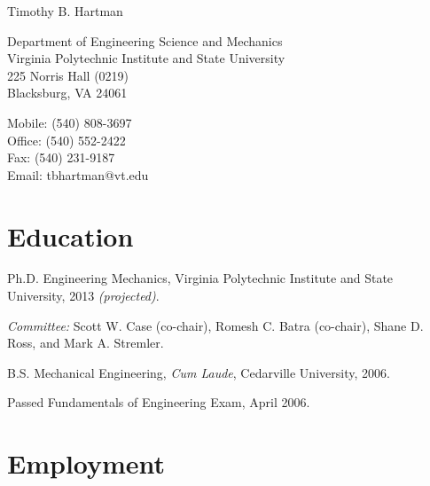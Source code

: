 \documentclass[10pt,letterpaper]{article}
\def\name{Timothy B. Hartman}
\renewenvironment{itemize}{
  \begin{list}{}{
    \setlength{\leftmargin}{1.5em}
    \setlength{\itemsep}{0.25em}
    \setlength{\parskip}{0pt}
    \setlength{\parsep}{0.25em}
  }
}{
  \end{list}
}
\begin{document}
{\huge \name}


\bigskip

\begin{minipage}[t]{0.5\textwidth}
  Department of Engineering Science and Mechanics \\
  Virginia Polytechnic Institute and State University \\
  225 Norris Hall (0219) \\
  Blacksburg, VA 24061
\end{minipage}
\begin{minipage}[t]{0.5\textwidth}
  Mobile: (540) 808-3697 \\
  Office: (540) 552-2422 \\
  Fax: (540) 231-9187 \\
  Email: tbhartman@vt.edu \\
\end{minipage}

%
%

\section*{Education}

\begin{itemize}
    \item Ph.D. Engineering Mechanics, Virginia Polytechnic Institute and State University, 2013 \textit{(projected)}.
    \begin{itemize}
        \item \textit{Committee:}
        Scott W. Case (co-chair), Romesh C. Batra (co-chair), Shane D. Ross, and Mark A. Stremler.
    \end{itemize}
    \item B.S. Mechanical Engineering, \textit{Cum Laude}, Cedarville University, 2006.
    \begin{itemize}
        \item Passed Fundamentals of Engineering Exam, April 2006.
    \end{itemize}
\end{itemize}

%
%

\section*{Employment}
\end{document}
